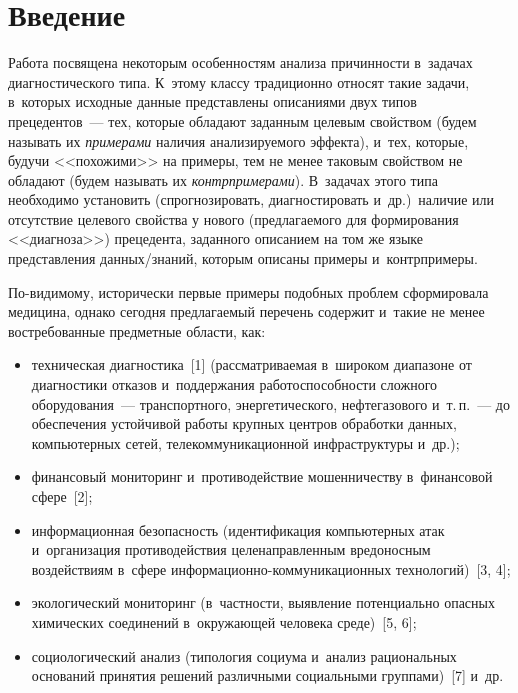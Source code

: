 
  
\vspace*{-3pt}



\thispagestyle{headings}

\begin{multicols}{2}

\label{st\stat}

\section{Введение }

  Работа посвящена некоторым особенностям анализа причинности в~задачах 
диагностического типа. К~этому классу традиционно относят такие задачи, 
в~которых исходные данные пред\-став\-ле\-ны описаниями двух типов  
прецедентов~--- тех, которые обладают заданным целевым свойством (будем 
называть их \textit{примерами} наличия анализируемого эффекта), и~тех, которые, 
будучи <<похожими>> на примеры, тем не менее таковым свойством не обладают 
(будем называть их \textit{контрпримерами}). В~задачах этого типа необходимо 
установить (спрогнозировать, диагностировать и~др.)\ наличие или отсутствие 
целевого свойства у нового (предлагаемого для формирования <<диагноза>>) 
прецедента, заданного описанием на том же языке представления  
дан\-ных/зна\-ний, которым описаны примеры и~контрпримеры.
  
  По-видимому, исторически первые примеры подобных проблем сформировала 
медицина, однако сегодня предлагаемый перечень содержит и~такие не менее 
востребованные предметные области, как:
  \begin{itemize}
\item техническая диагностика~[1] (рассматриваемая в~широком диапазоне от 
диагностики отказов и~поддержания работоспособности сложного 
оборудования~--- транспортного, энергетического, нефтегазового и~т.\,п.~--- до 
обеспечения устойчивой работы крупных центров обработки данных, 
компьютерных сетей, телекоммуникационной инфраструктуры и~др.);
\item финансовый мониторинг и~противодействие мошенничеству 
в~финансовой сфере~[2];
\item информационная безопасность (идентификация компьютерных атак 
и~организация противодействия целенаправленным вредоносным 
воздействиям в~сфере ин\-фор\-ма\-ци\-он\-но-ком\-му\-ни\-ка\-ци\-он\-ных 
технологий)~[3, 4];
\item экологический мониторинг (в~частности, выявление потенциально 
опасных химических соединений в~окружающей человека среде)~[5, 6];
\item социологический анализ (типология социума и~анализ рациональных 
оснований принятия решений различными социальными группами)~[7] и~др. 
\end{itemize}


\end{multicols}
